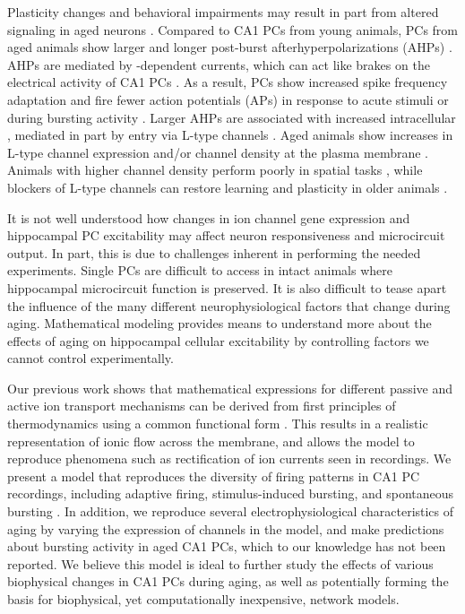 \documentclass[12pt]{article}
\begin{document}
Plasticity changes and behavioral impairments may result in part from altered {\Ca} signaling
in aged neurons
\citep{oh2010learning,rosenzweig2003impact}. Compared to CA1 PCs from young animals, PCs from aged animals show larger and longer post-burst afterhyperpolarizations (AHPs)
\citep{landfield1984prolonged,gant2009action,power2002age}. AHPs
are mediated by {\Ca}-dependent {\K} currents, which can act like brakes on the electrical activity of CA1 PCs
\citep{alger1980epileptiform,hotson1980calcium}. As a result, PCs show increased spike frequency adaptation and fire fewer action potentials (APs) in response to acute stimuli or during bursting activity 
\citep{gant2006early,moyer1992nimodipine,tombaugh2005slow}. Larger AHPs are associated with increased intracellular {\Ca}, mediated in part
by {\Ca} entry via L-type channels
\citep{campbell1996aging,moyer1992nimodipine,power2002age,thibault2001elevated}. Aged
animals show increases in L-type channel expression and/or channel
density at the plasma membrane
\citep{herman1998up,thibault1996increase,veng2002regionally,nunez2014surface}.
Animals with higher {\Ca} channel density perform poorly in spatial
tasks 
\citep{thibault1996increase}, while blockers of L-type channels can
restore learning and plasticity in older animals
\citep{norris1998reversal,sandin1990aging}.

It is not well understood how changes
in ion
channel gene expression and hippocampal PC excitability may affect neuron
responsiveness and microcircuit output. In part, this is due
to challenges inherent in performing the needed experiments. Single PCs are difficult
to access in intact animals where hippocampal microcircuit function is
preserved. It is also difficult to tease apart the influence of the many different neurophysiological factors that
change during aging. 
Mathematical modeling provides means to understand more about the effects of aging on hippocampal cellular excitability by controlling factors we cannot control experimentally.

Our previous work shows that mathematical expressions for different passive and active ion transport mechanisms can be derived from first principles of thermodynamics \cite{herrera2012membranes,herrera2013relating} using a common functional form \cite{herrera2018thermodynamic}. This results in a realistic representation of ionic flow across the membrane, and allows the model to reproduce phenomena such as rectification of ion currents seen in recordings. We present a model that reproduces the diversity of firing patterns in CA1 PC recordings, including adaptive firing, stimulus-induced bursting, and spontaneous bursting \cite{mckiernan2017ca1}. In addition, we reproduce several electrophysiological characteristics of aging by varying the expression of {\Ca} channels in the model, and make predictions about bursting activity in aged CA1 PCs, which to our knowledge has not been reported. We believe this model is ideal to further study the effects of various biophysical changes in CA1 PCs during aging, as well as potentially forming the basis for biophysical, yet computationally inexpensive, network models.
\end{document}
